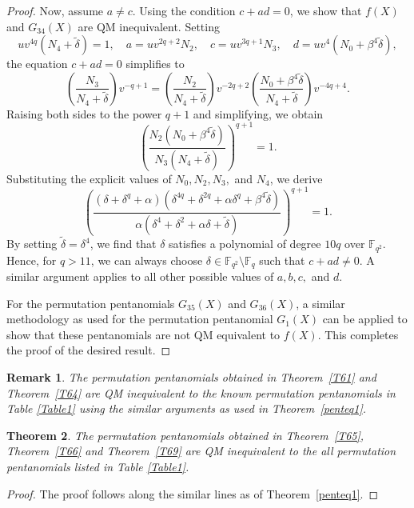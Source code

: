 \documentclass[12pt]{amsart}
\newtheorem{thm}{Theorem}[section]
\newtheorem{rmk}[thm]{Remark}
\numberwithin{equation}{section}
\theoremstyle{definition}
\begin{document}
\begin{proof}
Now, assume \( a \neq c \). Using the condition \( c + ad = 0 \), we show that \( f(X) \) and \(G_{34}(X) \) are QM inequivalent. Setting  
\[
uv^{4q} (N_4 + \tilde{\delta}) = 1, \quad a = uv^{2q+2} N_2, \quad c = uv^{3q+1} N_3, \quad d = uv^4 (N_0 + \beta^4 \tilde{\delta}),
\]  
the equation \( c + ad = 0 \) simplifies to  
\[
\left( \frac{N_3}{N_4 + \tilde{\delta}} \right) v^{-q+1} = \left( \frac{N_2}{N_4 + \tilde{\delta}} \right) v^{-2q+2} \left( \frac{N_0 + \beta^4 \tilde{\delta}}{N_4 + \tilde{\delta}} \right) v^{-4q+4}.
\]  
Raising both sides to the power \( q+1 \) and simplifying, we obtain  
\[
\left( \frac{N_2 (N_0 + \beta^4 \tilde{\delta})}{N_3 (N_4 + \tilde{\delta})} \right)^{q+1} = 1.
\]  
Substituting the explicit values of \( N_0, N_2, N_3, \) and \( N_4 \), we derive  
\[
\left( \frac{(\delta + \delta^q + \alpha)(\delta^{4q} + \delta^{2q} + \alpha \delta^q + \beta^4 \tilde{\delta})}{\alpha(\delta^4 + \delta^2 + \alpha \delta + \tilde{\delta})} \right)^{q+1} = 1.
\]  
By setting \( \tilde{\delta} = \delta^4 \), we find that \( \delta \) satisfies a polynomial of degree \( 10q \) over \( \mathbb{F}_{q^2} \). Hence, for \( q > 11 \), we can always choose \( \delta \in \mathbb{F}_{q^2} \setminus \mathbb{F}_q \) such that \( c + ad \neq 0 \). A similar argument applies to all other possible values of \( a, b, c, \) and \( d \).  

For the permutation pentanomials $G_{35}(X)$ and $G_{36}(X)$, a similar methodology as used for the permutation pentanomial $G_{1}(X)$ can be applied to show that these pentanomials are not QM equivalent to \( f(X) \). This completes the proof of the desired result.
\end{proof}

\begin{rmk}
  The permutation pentanomials obtained in Theorem~\ref{T61} and Theorem~\ref{T64} are QM inequivalent to the known permutation pentanomials in Table \ref{Table1} using the similar arguments as used in Theorem~\ref{penteq1}.
\end{rmk}

\begin{thm}\label{penteq2}
 The permutation pentanomials obtained in Theorem~\ref{T65}, Theorem~\ref{T66} and Theorem~\ref{T69} are QM inequivalent to the all permutation pentanomials listed in Table \ref{Table1}.
\end{thm}
\begin{proof}
 The proof follows along the similar lines as of Theorem~\ref{penteq1}.
\end{proof}
\end{document}
